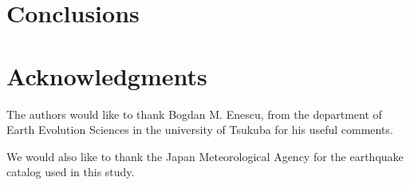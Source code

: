 \section{Conclusions}\label{Conclusions}

\section*{Acknowledgments}
The authors would like to thank Bogdan M. Enescu, from the department
of Earth Evolution Sciences in the university of Tsukuba for his
useful comments. 

We would also like to thank the Japan Meteorological Agency for the
earthquake catalog used in this study.
